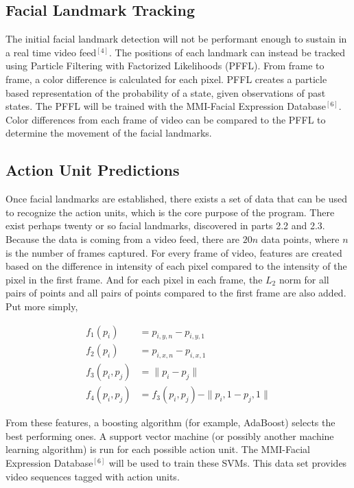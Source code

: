 \documentclass[12pt,a4paper]{scrartcl}
\begin{document}
	\subsection{Facial Landmark Tracking}
	The initial facial landmark detection will not be performant enough to sustain in a real time video feed$^{[4]}$. The positions of each landmark can instead be tracked using Particle Filtering with Factorized Likelihoods (PFFL). From frame to frame, a color difference is calculated for each pixel. PFFL creates a particle based representation of the probability of a state, given observations of past states. The PFFL will be trained with the MMI-Facial Expression Database$^{[6]}$. Color differences from each frame of video can be compared to the PFFL to determine the movement of the facial landmarks.
	
	\subsection{Action Unit Predictions}
	Once facial landmarks are established, there exists a set of data that can be used to recognize the action units, which is the core purpose of the program. There exist perhaps twenty or so facial landmarks, discovered in parts 2.2 and 2.3. Because the data is coming from a video feed, there are $20n$ data points, where $n$ is the number of frames captured. For every frame of video, features are created based on the difference in intensity of each pixel compared to the intensity of the pixel in the first frame. And for each pixel in each frame, the $L_2$ norm for all pairs of points and all pairs of points compared to the first frame are also added. Put more simply, 
	
	\begin{align}
	f_1(p_i) &= p_{i,y,n} - p_{i,y,1} \\
	f_2(p_i) &= p_{i,x,n} - p_{i,x,1} \\
	f_3(p_i, p_j) &= \parallel p_i - p_j \parallel \\
	f_4(p_i, p_j) &= f_3(p_i, p_j) - \parallel p_i,1 - p_j,1 \parallel
	\end{align}
	
	
	From these features, a boosting algorithm (for example, AdaBoost) selects the best performing ones. A support vector machine (or possibly another machine learning algorithm) is run for each possible action unit. The MMI-Facial Expression Database$^{[6]}$ will be used to train these SVMs. This data set provides video sequences tagged with action units.
	
\end{document}
